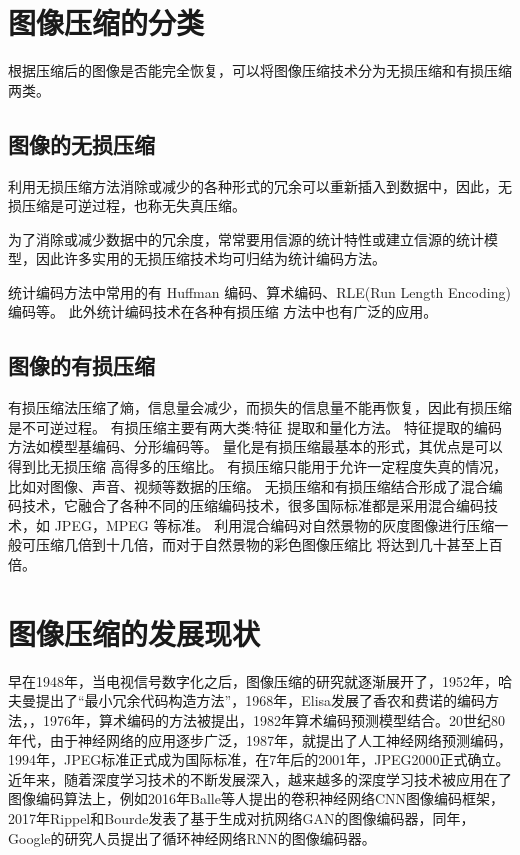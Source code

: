 \section{图像压缩的分类}
根据压缩后的图像是否能完全恢复，可以将图像压缩技术分为无损压缩和有损压缩两类。
\subsection{图像的无损压缩}

利用无损压缩方法消除或减少的各种形式的冗余可以重新插入到数据中，因此，无损压缩是可逆过程，也称无失真压缩。

为了消除或减少数据中的冗余度，常常要用信源的统计特性或建立信源的统计模型，因此许多实用的无损压缩技术均可归结为统计编码方法。

统计编码方法中常用的有 Huffman 编码、算术编码、RLE(Run Length Encoding)编码等。 此外统计编码技术在各种有损压缩 方法中也有广泛的应用。

\subsection{图像的有损压缩}

有损压缩法压缩了熵，信息量会减少，而损失的信息量不能再恢复，因此有损压缩是不可逆过程。 有损压缩主要有两大类:特征 提取和量化方法。 特征提取的编码方法如模型基编码、分形编码等。 量化是有损压缩最基本的形式，其优点是可以得到比无损压缩 高得多的压缩比。 有损压缩只能用于允许一定程度失真的情况，比如对图像、声音、视频等数据的压缩。
无损压缩和有损压缩结合形成了混合编码技术，它融合了各种不同的压缩编码技术，很多国际标准都是采用混合编码技术，如 JPEG，MPEG 等标准。 利用混合编码对自然景物的灰度图像进行压缩一般可压缩几倍到十几倍，而对于自然景物的彩色图像压缩比 将达到几十甚至上百倍。

\section{图像压缩的发展现状}

早在1948年，当电视信号数字化之后，图像压缩的研究就逐渐展开了，1952年，哈夫曼提出了“最小冗余代码构造方法”，1968年，Elisa发展了香农和费诺的编码方法，，1976年，算术编码的方法被提出，1982年算术编码预测模型结合。20世纪80年代，由于神经网络的应用逐步广泛，1987年，就提出了人工神经网络预测编码，1994年，JPEG标准正式成为国际标准，在7年后的2001年，JPEG2000正式确立。近年来，随着深度学习技术的不断发展深入，越来越多的深度学习技术被应用在了图像编码算法上，例如2016年Balle等人提出的卷积神经网络CNN图像编码框架，2017年Rippel和Bourde发表了基于生成对抗网络GAN的图像编码器，同年，Google的研究人员提出了循环神经网络RNN的图像编码器。
